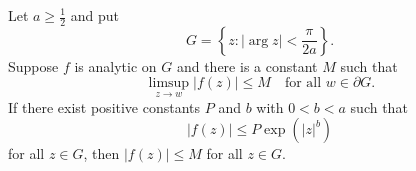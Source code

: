 Let $a \geq \frac{1}{2}$ and put
\[
G = \left\{ z : |\arg z| < \frac{\pi}{2a} \right\}.
\]
Suppose $f$ is analytic on $G$ and there is a constant $M$ such that
\[
\limsup_{z \to w} |f(z)| \leq M \quad \text{for all } w \in \partial G.
\]
If there exist positive constants $P$ and $b$ with $0 < b < a$ such that
\[
|f(z)| \leq P \exp(|z|^b)
\]
for all $z \in G$, then $|f(z)| \leq M$ for all $z \in G$.
